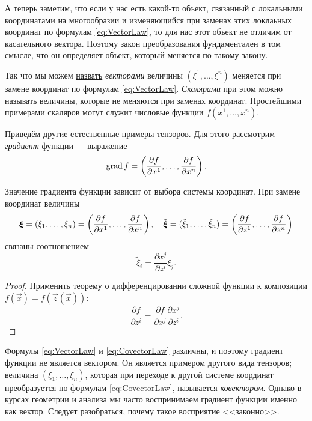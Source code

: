 А теперь заметим, что если у нас есть какой-то объект, связанный с локальными координатами на многообразии и изменяющийся при заменах этих локлаьных координат по формулам \eqref{eq:VectorLaw}, то для нас этот объект не отличим от касательного вектора. Поэтому закон преобразования фундаментален в том смысле, что он определяет объект, который меняется по такому закону.

Так что мы можем \underline{назвать} \textit{векторами} величины $(\xi^1, \ldots, \xi^n)$ меняется при замене координат по формулам \eqref{eq:VectorLaw}. \textit{Скалярами} при этом можно называть величины, которые не меняются при заменах координат. Простейшими примерами скаляров могут служит числовые функции $f(x^1, \ldots, x^n)$.

Приведём другие естественные примеры тензоров. Для этого рассмотрим \textit{градиент} функции --- выражение
\[
	\operatorname{grad} f = \left(\frac{\partial f}{\partial x^1}, \ldots, \frac{\partial f}{\partial x^n}\right).
\]

\begin{theorem}
	Значение градиента функции зависит от выбора системы координат. При замене координат величины
	\[
		\boldsymbol{\xi} = (\xi_1, \ldots, \xi_n) = \left(\frac{\partial f}{\partial x^1}, \ldots, \frac{\partial f}{\partial x^n}\right),\quad
		\tilde{\boldsymbol{\xi}} = (\tilde{\xi}_1, \ldots, \tilde{\xi}_n) = \left(\frac{\partial f}{\partial z^1}, \ldots, \frac{\partial f}{\partial z^n}\right)
	\]
	связаны соотношением
	\begin{equation} \label{eq:CovectorLaw}
		\tilde{\xi}_i = \frac{\partial x^j}{\partial z^i}\xi_j.
	\end{equation}
\end{theorem}

\begin{proof}
	Применить теорему о дифференцировании сложной функции к композиции $f(\vec{x}) = f(\vec{z}(\vec{x}))$:
	\[
		\frac{\partial f}{\partial z^i} = \frac{\partial f}{\partial x^j}\frac{\partial x^j}{\partial z^i}.
	\]
\end{proof}

Формулы \eqref{eq:VectorLaw} и \eqref{eq:CovectorLaw} различны, и поэтому градиент функции не является вектором. Он является примером другого вида тензоров; величина $(\xi_1, \ldots, \xi_n)$, которая при переходе к другой системе координат преобразуется по формулам \eqref{eq:CovectorLaw}, называется \textit{ковектором}. Однако в курсах геометрии и анализа мы часто воспринимаем градиент функции именно как вектор. Следует разобраться, почему такое восприятие <<законно>>.

